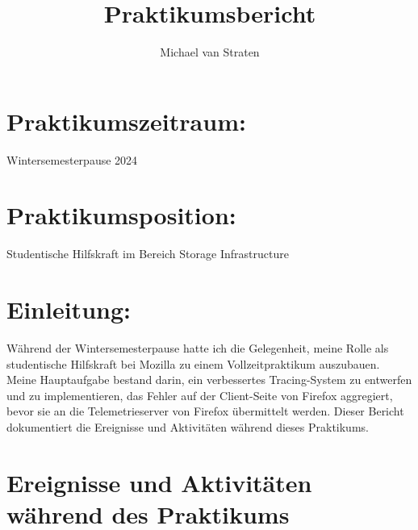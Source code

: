 \documentclass{article}
\title{Praktikumsbericht}
\author{Michael van Straten}
\date{}
\begin{document}
\maketitle

\section*{Praktikumszeitraum:}
Wintersemesterpause 2024

\section*{Praktikumsposition:}
Studentische Hilfskraft im Bereich Storage Infrastructure

\section*{Einleitung:}

Während der Wintersemesterpause hatte ich die Gelegenheit, meine Rolle als
studentische Hilfskraft bei Mozilla zu einem Vollzeitpraktikum auszubauen.
Meine Hauptaufgabe bestand darin, ein verbessertes Tracing-System zu entwerfen
und zu implementieren, das Fehler auf der Client-Seite von Firefox aggregiert,
bevor sie an die Telemetrieserver von Firefox übermittelt werden. Dieser
Bericht dokumentiert die Ereignisse und Aktivitäten während dieses Praktikums.

\section*{Ereignisse und Aktivitäten während des Praktikums}
\end{document}

